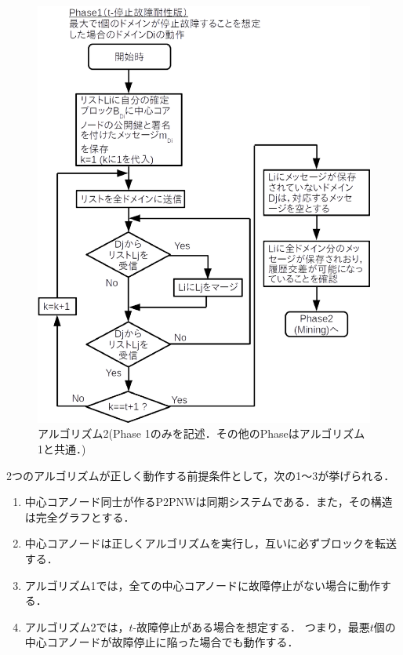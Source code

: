 \documentclass[a4paper,12pt]{jsarticle}
\begin{document}
\begin{figure}[tbh]
  \begin{center}
    \includegraphics{pht/flow_chart-algorithm2.eps}
  \end{center}
  \caption{アルゴリズム2(Phase 1のみを記述．その他のPhaseはアルゴリズム1と共通．)}
  \label{fig:algorithm2}
\end{figure}
%
 2つのアルゴリズムが正しく動作する前提条件として，次の1〜3が挙げられる．

\hspace{5mm}
%
\begin{enumerate}
  \item 中心コアノード同士が作るP2PNWは同期システムである．また，その構造は完全グラフとする．
  
  \item 中心コアノードは正しくアルゴリズムを実行し，互いに必ずブロックを転送する．
  
  \item アルゴリズム1では，全ての中心コアノードに故障停止がない場合に動作する．
  
  \item アルゴリズム2では，$t$-故障停止がある場合を想定する．
        つまり，最悪$t$個の中心コアノードが故障停止に陥った場合でも動作する．
\end{enumerate}
%
\hspace{5mm}
\end{document}
